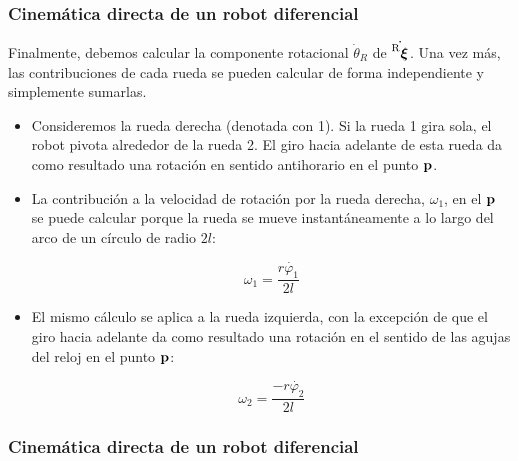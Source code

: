 \begin{frame}
    \frametitle{Cinemática directa de un robot diferencial}
    \small

    Finalmente, debemos calcular la componente rotacional $\dot{\theta}_{R}$ de $\dot{\prescript{\mathrm{R}}{}{{\boldsymbol{\mathbf{\xi}}}_\mathrm{}}}$. Una vez más, las contribuciones de cada rueda se pueden calcular de forma independiente y simplemente sumarlas. 
    

    
    \begin{itemize}
        \item Consideremos la rueda derecha (denotada con 1). Si la rueda 1 gira sola, el robot pivota alrededor de la rueda 2. El giro hacia adelante de esta rueda da como resultado una rotación en sentido antihorario en el punto $\boldsymbol{\mathbf{p}}$.
        
        \item La contribución a la velocidad de rotación por la rueda derecha, $\omega_{1}$, en el $\boldsymbol{\mathbf{p}}$ se puede calcular porque la rueda se mueve instantáneamente a lo largo del arco de un círculo de radio $2l$:
        
        \begin{equation*}
            \omega_{1} = \dfrac{r\dot{\varphi_{1}}}{2l}
        \end{equation*}
        
        \item El mismo cálculo se aplica a la rueda izquierda, con la excepción de que el giro hacia adelante da como resultado una rotación en el sentido de las agujas del reloj en el punto $\boldsymbol{\mathbf{p}}$:
        
        \begin{equation*}
            \omega_{2} = \dfrac{-r\dot{\varphi_{2}}}{2l}
        \end{equation*}
    \end{itemize}


\end{frame}

\begin{frame}
    \frametitle{Cinemática directa de un robot diferencial}
    
    
    

\end{frame}
